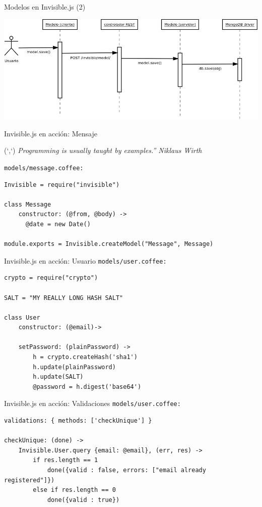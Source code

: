 \documentclass[xcolor=dvipsnames, 14pt]{beamer}
\newenvironment{reference}[2]{%
  \begin{textblock*}{\textwidth}(#1,#2)
      \footnotesize\it\bgroup\color{gray!50!black}}{\egroup\end{textblock*}}
\begin{document}
\begin{frame}{Modelos en Invisible.js (2)}
    \begin{center}
        \includegraphics[width=\textwidth]{img/secuencia.png}
    \end{center}
\end{frame}

\begin{frame}[fragile]{Invisible.js en acción: Mensaje}
\begin{reference}{4mm}{13mm}
``Programming is usually taught by examples.'' Niklaus Wirth
\end{reference}

\texttt{models/message.coffee:}
\begin{lstlisting}
Invisible = require("invisible")

class Message
    constructor: (@from, @body) ->
      @date = new Date()

module.exports = Invisible.createModel("Message", Message)
\end{lstlisting}

\end{frame}

\begin{frame}[fragile]{Invisible.js en acción: Usuario}
\texttt{models/user.coffee:}
\begin{lstlisting}
crypto = require("crypto")

SALT = "MY REALLY LONG HASH SALT"

class User
    constructor: (@email)->

    setPassword: (plainPassword) ->
        h = crypto.createHash('sha1')
        h.update(plainPassword)
        h.update(SALT)
        @password = h.digest('base64')
\end{lstlisting}
\end{frame}

\begin{frame}[fragile]{Invisible.js en acción: Validaciones}
\texttt{models/user.coffee:}
\begin{lstlisting}
validations: { methods: ['checkUnique'] }

checkUnique: (done) ->
    Invisible.User.query {email: @email}, (err, res) ->
        if res.length == 1
            done({valid : false, errors: ["email already registered"]})
        else if res.length == 0
            done({valid : true})
\end{lstlisting}
\end{frame}
\end{document}
